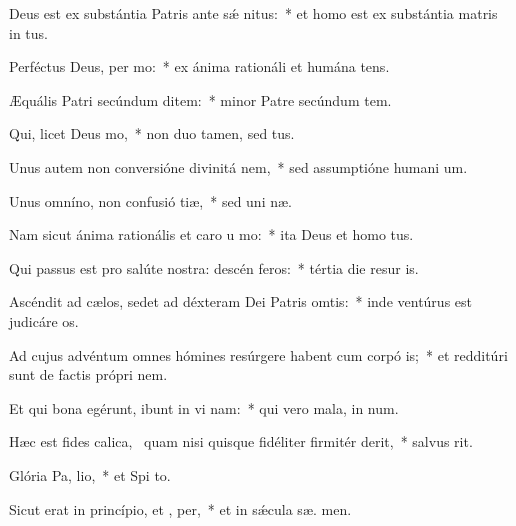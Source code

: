 \item Deus est ex substántia Patris ante sǽ nitus:~* et homo est ex substántia matris in  tus.
\item Perféctus Deus, per mo:~* ex ánima rationáli et humána  tens.
\item Æquális Patri secúndum ditem:~* minor Patre secúndum tem.
\item Qui, licet Deus   mo,~* non duo tamen, sed   tus.
\item Unus autem non conversióne divinitá  nem,~* sed assumptióne humani  um.
\item Unus omníno, non confusió tiæ,~* sed uni næ.
\item Nam sicut ánima rationális et caro u  mo:~* ita Deus et homo   tus.
\item Qui passus est pro salúte nostra: descén  feros:~* tértia die resur  is.
\item Ascéndit ad cælos, sedet ad déxteram Dei Patris omtis:~* inde ventúrus est judicáre   os.
\item Ad cujus advéntum omnes hómines resúrgere habent cum corpó is;~* et redditúri sunt de factis própri nem.
\item Et qui bona egérunt, ibunt in vi nam:~* qui vero mala, in  num.
\item Hæc est fides calica,~\pscross{} quam nisi quisque fidéliter firmitér derit,~* salvus   rit.
\item Glória Pa,  lio,~* et Spi to.
\item Sicut erat in princípio, et ,  per,~* et in sǽcula sæ. men.
